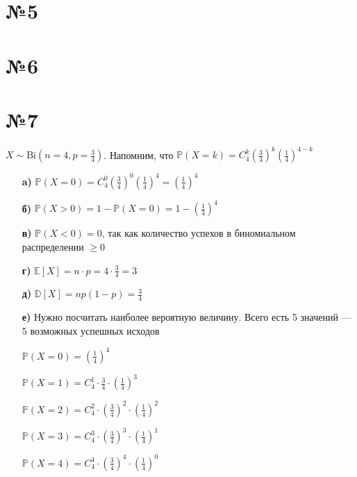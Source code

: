 \documentclass[a4paper, 10pt]{article}
\newcommand{\prob}[1]{\mathbb{P}\left(#1\right)}
\newcommand{\matwait}[1]{\mathbb{E}\left[#1\right]}
\newcommand{\dispersia}[1]{\mathbb{D}\left[#1\right]}
\begin{document}
\section*{№5}
\section*{№6}
\section*{№7}
$X\sim\text{Bi}(n=4,p=\frac{3}{4})$. Напомним, что $\prob{X=k}=C_4^k (\frac{3}{4})^k(\frac{1}{4})^{4-k}$
\begin{itemize}
    \item[\textbf{a)}] $\prob{X=0}=C_4^0 \left(\displaystyle\frac{3}{4}\right)^0\left(\displaystyle\frac{1}{4}\right)^{4}=\left(\displaystyle\frac{1}{4}\right)^4$
    \item[\textbf{б)}] $\prob{X>0}=1-\prob{X=0}=1-\left(\displaystyle\frac{1}{4}\right)^4$
    \item[\textbf{в)}] $\prob{X<0}=0$, так как количество успехов в биномиальном распределении $\geqslant0$
    \item[\textbf{г)}] $\matwait{X}=n\cdot p=4\cdot\frac{3}{4}=3$
    \item[\textbf{д)}] $\dispersia{X}=np(1-p)=\frac{3}{4}$
    \item[\textbf{е)}] Нужно посчитать наиболее вероятную величину. Всего есть 5 значений — 5 возможных успешных исходов
    
    $\prob{X=0}=\left(\displaystyle\frac{1}{4}\right)^4$
    
    $\prob{X=1}=C_4^1\cdot\displaystyle\frac{3}{4}\cdot\left(\frac{1}{4}\right)^3$

    $\prob{X=2}=C_4^2\cdot\displaystyle\left(\frac{3}{4}\right)^2\cdot\left(\frac{1}{4}\right)^2$

    $\prob{X=3}=C_4^3\cdot\displaystyle\left(\frac{3}{4}\right)^3\cdot\left(\frac{1}{4}\right)^1$

    $\prob{X=4}=C_4^4\cdot\displaystyle\left(\frac{3}{4}\right)^4\cdot\left(\frac{1}{4}\right)^0$

\end{itemize}
\end{document}
